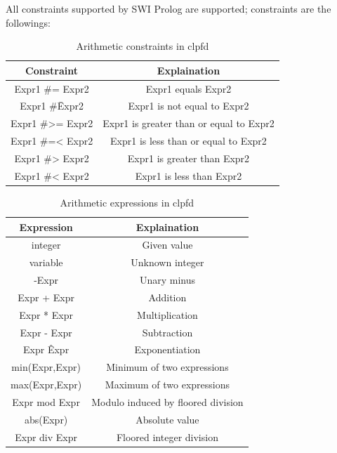 All constraints supported by SWI Prolog are supported; constraints are the followings:\newpage
\begin{center}
    \begin{table}
        \begin{tabular}{||c c ||} 
        \hline
        Constraint & Explaination \\ [0.5ex] 
        \hline\hline
        Expr1 \#= Expr2	& Expr1 equals Expr2 \\ 
        \hline
        Expr1 \#\= Expr2 & Expr1 is not equal to Expr2 \\
        \hline
        Expr1 \#>= Expr2 & Expr1 is greater than or equal to Expr2\\
        \hline
        Expr1 \#=< Expr2 & Expr1 is less than or equal to Expr2 \\
        \hline
        Expr1 \#> Expr2	& Expr1 is greater than Expr2 \\
        \hline
        Expr1 \#< Expr2	& Expr1 is less than Expr2 \\
        \hline
        \end{tabular}
        \label{table:arithmetic_constraints}
        \caption{Arithmetic constraints in clpfd}
    \end{table}    
\end{center}

\begin{center}
    \begin{table}
        \begin{tabular}{||c c ||} 
        \hline
        Expression & Explaination \\ [0.5ex] 
        \hline\hline
        integer	& Given value \\ 
        \hline
        variable & Unknown integer \\
        \hline
        -Expr & Unary minus\\
        \hline
        Expr + Expr	 & Addition \\
        \hline
        Expr * Expr	& Multiplication \\
        \hline
        Expr - Expr	& Subtraction \\
        \hline
        Expr \^ Expr& Exponentiation \\
        \hline
        min(Expr,Expr) & Minimum of two expressions \\
        \hline
        max(Expr,Expr) & Maximum of two expressions \\
        \hline
        Expr mod Expr & Modulo induced by floored division \\
        \hline
        abs(Expr) & Absolute value \\
        \hline
        Expr div Expr & Floored integer division \\
        \hline
        \end{tabular}
        \label{table:expressions_clp}
        \caption{Arithmetic expressions in clpfd}
    \end{table}    
\end{center}


